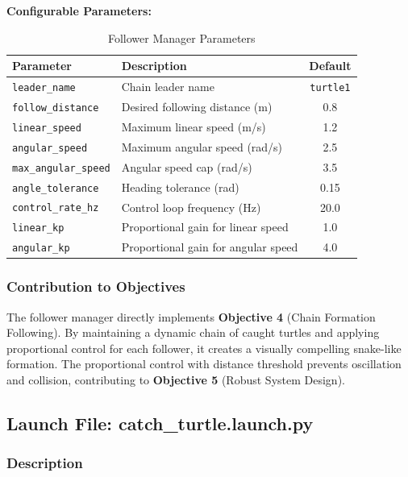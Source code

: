 \documentclass[12pt,a4paper]{article}
\begin{document}
\textbf{Configurable Parameters:}

\begin{table}[H]
\centering
\caption{Follower Manager Parameters}
\begin{tabular}{llc}
\toprule
\textbf{Parameter} & \textbf{Description} & \textbf{Default} \\
\midrule
\texttt{leader\_name} & Chain leader name & \texttt{turtle1} \\
\texttt{follow\_distance} & Desired following distance (m) & 0.8 \\
\texttt{linear\_speed} & Maximum linear speed (m/s) & 1.2 \\
\texttt{angular\_speed} & Maximum angular speed (rad/s) & 2.5 \\
\texttt{max\_angular\_speed} & Angular speed cap (rad/s) & 3.5 \\
\texttt{angle\_tolerance} & Heading tolerance (rad) & 0.15 \\
\texttt{control\_rate\_hz} & Control loop frequency (Hz) & 20.0 \\
\texttt{linear\_kp} & Proportional gain for linear speed & 1.0 \\
\texttt{angular\_kp} & Proportional gain for angular speed & 4.0 \\
\bottomrule
\end{tabular}
\end{table}

\subsubsection{Contribution to Objectives}

The follower manager directly implements \textbf{Objective 4} (Chain Formation Following). By maintaining a dynamic chain of caught turtles and applying proportional control for each follower, it creates a visually compelling snake-like formation. The proportional control with distance threshold prevents oscillation and collision, contributing to \textbf{Objective 5} (Robust System Design).

\subsection{Launch File: catch\_turtle.launch.py}
\label{subsec:launch}

\subsubsection{Description}
\end{document}
